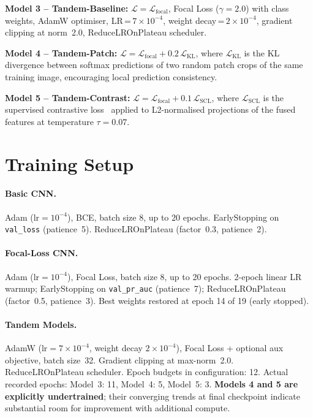 \documentclass[10pt,twocolumn]{article}
\begin{document}
\textbf{Model 3 -- Tandem-Baseline:}
$\mathcal{L} = \mathcal{L}_\text{focal}$, Focal Loss
($\gamma=2.0$) with class weights, AdamW optimiser,
LR\,=\,$7\times10^{-4}$, weight decay\,=\,$2\times10^{-4}$,
gradient clipping at norm~2.0, ReduceLROnPlateau scheduler.

\textbf{Model 4 -- Tandem-Patch:}
$\mathcal{L} = \mathcal{L}_\text{focal} + 0.2\,\mathcal{L}_\text{KL}$,
where $\mathcal{L}_\text{KL}$ is the KL divergence between
softmax predictions of two random patch crops of the same training image,
encouraging local prediction consistency.

\textbf{Model 5 -- Tandem-Contrast:}
$\mathcal{L} = \mathcal{L}_\text{focal} + 0.1\,\mathcal{L}_\text{SCL}$,
where $\mathcal{L}_\text{SCL}$ is the supervised contrastive
loss~\cite{khosla2020supervised} applied to L2-normalised projections
of the fused features at temperature $\tau=0.07$.

\section{Training Setup}
\label{sec:training}

\paragraph{Basic CNN.}
Adam ($\text{lr}=10^{-4}$), BCE, batch size 8, up to 20 epochs.
EarlyStopping on \texttt{val\_loss} (patience~5).
ReduceLROnPlateau (factor~0.3, patience~2).

\paragraph{Focal-Loss CNN.}
Adam ($\text{lr}=10^{-4}$), Focal Loss, batch size 8, up to 20 epochs.
2-epoch linear LR warmup; EarlyStopping on \texttt{val\_pr\_auc}
(patience~7); ReduceLROnPlateau (factor~0.5, patience~3).
Best weights restored at epoch 14 of 19 (early stopped).

\paragraph{Tandem Models.}
AdamW ($\text{lr}=7\times10^{-4}$, weight decay $2\times10^{-4}$),
Focal Loss + optional aux objective, batch size~32.
Gradient clipping at max-norm~2.0.
ReduceLROnPlateau scheduler.
Epoch budgets in configuration: 12.
Actual recorded epochs: Model~3: 11, Model~4: 5, Model~5: 3.
\textbf{Models 4 and 5 are explicitly undertrained}; their converging
trends at final checkpoint indicate substantial room for improvement
with additional compute.
\end{document}
